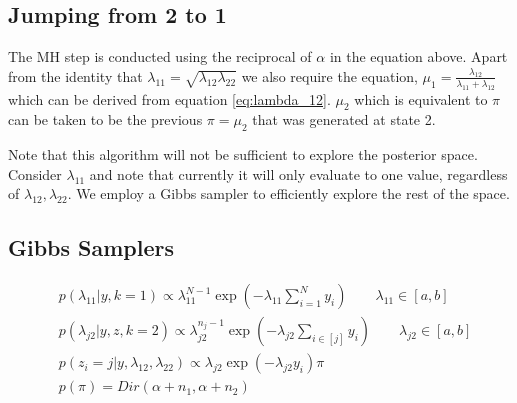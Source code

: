 \documentclass{article}
\begin{document}
\subsection{Jumping from 2 to 1}
The MH step is conducted using the reciprocal of $\alpha$ in the equation above. Apart from the identity that $\lambda_{11}=\sqrt{\lambda_{12}\lambda_{22}}$ we also require the equation, $\mu_1=\frac{\lambda_{12}}{\lambda_{11}+\lambda_{12}}$ which can be derived from equation \ref{eq:lambda_12}. $\mu_2$ which is equivalent to $\pi$ can be taken to be the previous $\pi=\mu_2$ that was generated at state 2.

Note that this algorithm will not be sufficient to explore the posterior space. Consider $\lambda_{11}$ and note that currently it will only evaluate to one value, regardless of $\lambda_{12}, \lambda_{22}$. We employ a Gibbs sampler to efficiently explore the rest of the space.

\subsection{Gibbs Samplers}
\begin{align}
& p(\lambda_{11}|y,k=1) \propto \lambda_{11}^{N-1}\exp(-\lambda_{11}\sum_{i=1}^{N}y_i)\qquad \lambda_{11}\in[a,b]\\
& p(\lambda_{j2}|y,z,k=2) \propto \lambda_{j2}^{n_j-1}\exp(-\lambda_{j2}\sum_{i\in[j]}y_i)\qquad \lambda_{j2}\in[a,b]\\
& p(z_i=j|y,\lambda_{12},\lambda_{22}) \propto \lambda_{j2}\exp(-\lambda_{j2}y_i)\pi\\
& p(\pi) = Dir(\alpha+n_1,\alpha+n_2)
\end{align}
\end{document}

